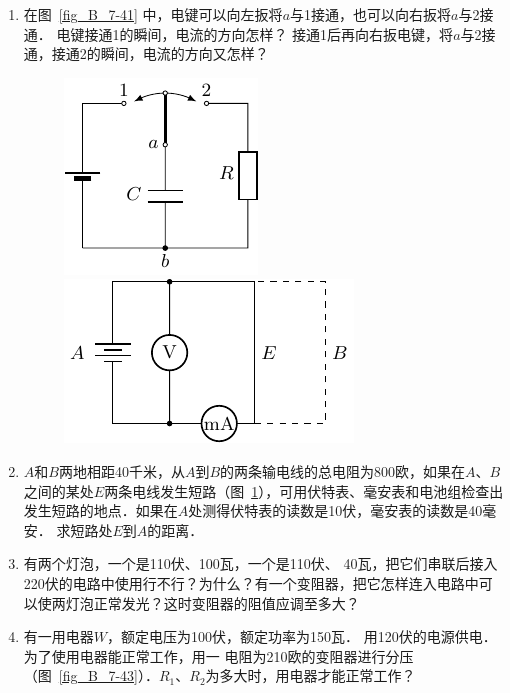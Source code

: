 \begin{enumerate}
    \item 在图~\ref{fig_B_7-41} 中，电键可以向左扳将$a$与1接通，也可以向右扳将$a$与2接通．
    电键接通1的瞬间，电流的方向怎样？
接通1后再向右扳电键，将$a$与2接通，接通2的瞬间，电流的方向又怎样？
\begin{figure}[htbp]
	\centering
	\begin{minipage}[t]{0.48\textwidth}
		\centering
		\includegraphics{fig/B/7-41.pdf}
		\caption{}\label{fig_B_7-41}
	\end{minipage}
	\begin{minipage}[t]{0.48\textwidth}
		\centering
		\includegraphics{fig/B/7-42.pdf}
		\caption{}\label{fig_B_7-42}
	\end{minipage}
\end{figure}
\item $A$和$B$两地相距40千米，从$A$到$B$的两条输电线的总电阻为800欧，如果在$A$、$B$之间的某处$E$两条电线发生短路（图~\ref{fig_B_7-42}），可用伏特表、毫安表和电池组检查出发生短路的地点．如果在$A$处测得伏特表的读数是10伏，毫安表的读数是40毫安．
求短路处$E$到$A$的距离．
\item 有两个灯泡，一个是110伏、100瓦，一个是110伏、
40瓦，把它们串联后接入220伏的电路中使用行不行？为什么？有一个变阻器，把它怎样连入电路中可以使两灯泡正常发光？这时变阻器的阻值应调至多大？
\item 有一用电器$W$，额定电压为100伏，额定功率为150瓦．
用120伏的电源供电．为了使用电器能正常工作，用一
电阻为210欧的变阻器进行分压（图~\ref{fig_B_7-43}）．$R_1$、$R_2$为多大时，用电器才能正常工作？
\begin{figure}[htbp]

\end{figure}
\end{enumerate}
